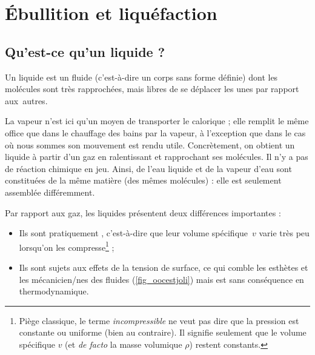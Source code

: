 \section{Ébullition et liquéfaction}

	\subsection{Qu’est-ce qu’un liquide ?}
	
		Un liquide est un fluide (c’est-à-dire un corps sans forme définie) dont les molécules sont très rapprochées, mais libres de se déplacer les unes par rapport aux~autres.
	
La vapeur n’est ici qu’un moyen de transporter le calorique ; elle remplit le même office que dans le chauffage des bains par la vapeur, à l’exception que dans le cas où nous sommes son mouvement est rendu utile.
		Concrètement, on obtient un liquide à partir d’un gaz en ralentissant et rapprochant ses molécules. Il n’y a pas de réaction chimique en jeu. Ainsi, de l’eau liquide et de la vapeur d’eau sont constituées de la même matière (des mêmes molécules) : elle est seulement assemblée différemment.
		
		Par rapport aux gaz, les liquides présentent deux différences importantes :
			\begin{itemize}
				\item Ils sont pratiquement , c’est-à-dire que leur volume spécifique~$v$ varie très peu lorsqu’on les compresse\footnote{Piège classique, le terme \emph{incompressible} ne veut pas dire que la pression est constante ou uniforme (bien au contraire). Il signifie seulement que le volume spécifique $v$ (et \textit{de facto} la masse volumique $\rho$) restent constants.} ;
				\item Ils sont sujets aux effets de la tension de surface, ce qui comble les esthètes et les mécanicien/nes des fluides (\cref{fig_oocestjoli}) mais est sans conséquence en thermodynamique.
			\end{itemize}
	
